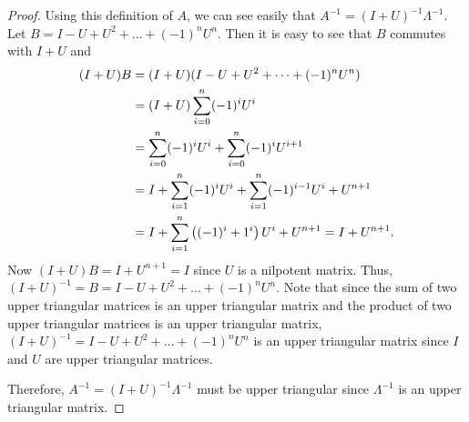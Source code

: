 \documentclass[12pt]{article}
\theoremstyle{definition}
\begin{document}
\begin{proof}
  Using this definition of $A$, we can see easily that $A^{-1} = (I + U)^{-1} \Lambda^{-1}$.
  Let $B =  I - U + U^2 + \dots + (-1)^{n}U^n$. Then it is easy to
  see that $B$ commutes with $I+U$ and
  \begin{align}
    (I + U)B
    &= (I + U)(I - U + U^2 + \dots + (-1)^{n}U^n) \notag \\
    &= (I + U)\sum_{i=0}^n(-1)^i U^i \notag \\
    &= \sum_{i=0}^n(-1)^i U^i + \sum_{i=0}^n(-1)^i U^{i+1} \notag \\
    &= I + \sum_{i=1}^n(-1)^i U^i + \sum_{i=1}^{n}(-1)^{i-1} U^{i} + U^{n+1} \notag \\
    &= I + \sum_{i=1}^n \left((-1)^i +1^{i}\right) U^i + U^{n+1} =I + U^{n+1}.
  \end{align}
  Now $(I + U)B = I + U^{n+1} = I$ since
  $U$ is a nilpotent matrix. Thus, $(I+U)^{-1} = B = I - U + U^2 + \dots + (-1)^{n}U^n$.
  Note that since the sum of two upper triangular matrices is an upper triangular matrix
  and the product of two upper triangular matrices is an upper triangular matrix,
  $(I + U)^{-1} = I - U + U^2 + \dots + (-1)^{n}U^n$ is an upper triangular matrix since
  $I$ and $U$ are upper triangular matrices.

  Therefore, $A^{-1} = (I+U)^{-1}\Lambda^{-1}$
  must be upper triangular since $\Lambda^{-1}$ is an upper triangular matrix.
\end{proof}
\end{document}
